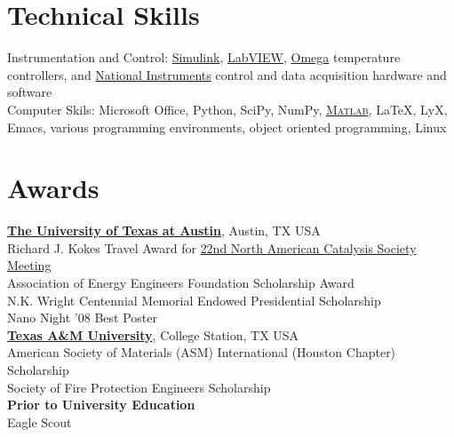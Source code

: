 \documentclass[centered]{res}
\begin{document}
\begin{resume}
\section{Technical Skills}
% 
Instrumentation and Control:
\href{http://www.mathworks.com/products/simulink/}{Simulink},
\href{http://www.ni.com/}{LabVIEW}, 
\href{http://www.omega.com/}{Omega} temperature controllers,
and
\href{http://www.ni.com}{National Instruments}
control and data acquisition hardware and software
\vspace{5pt} \\
%
Computer Skils: Microsoft Office, Python, SciPy, NumPy,
\href{http://www.mathworks.com/products/matlab/}{\textsc{Matlab}},
\LaTeX, LyX, Emacs, various programming environments, object oriented
programming, Linux
%

\section{Awards}
% 
\href{http://www.utexas.edu/}{\textbf{The University of Texas at
    Austin}}, Austin, TX USA \\
Richard J. Kokes Travel Award for
\href{http://www.22nam.org/}{22nd North American Catalysis Society
  Meeting} \\
Association of Energy Engineers Foundation Scholarship Award \\
N.K. Wright Centennial Memorial Endowed Presidential Scholarship \\
Nano Night '08 Best Poster \vspace{5pt} \\
%
\href{http://www.tamu.edu/}{\textbf{Texas A\&M University}}, College
Station, TX USA \\
American Society of Materials (ASM) International (Houston Chapter)
Scholarship \\
Society of Fire Protection Engineers Scholarship \vspace{5pt} \\
%
\textbf{Prior to University Education} \\
Eagle Scout

\end{resume}
\end{document}
